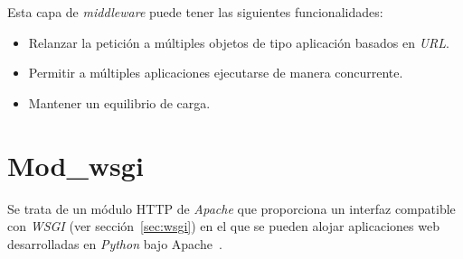 Esta capa de \textit{middleware} puede tener las siguientes funcionalidades:
\begin{itemize}
	\item Relanzar la petición a múltiples objetos de tipo aplicación basados en \textit{URL}.
	\item Permitir a múltiples aplicaciones ejecutarse de manera concurrente.
	\item Mantener un equilibrio de carga.
\end{itemize}

\section{Mod\_wsgi}
Se trata de un módulo HTTP de \textit{Apache} que proporciona un interfaz compatible con \textit{WSGI} (ver sección~\ref{sec:wsgi}) en el que se pueden alojar aplicaciones web desarrolladas en \textit{Python} bajo Apache~\cite{wiki:modwsgi}.